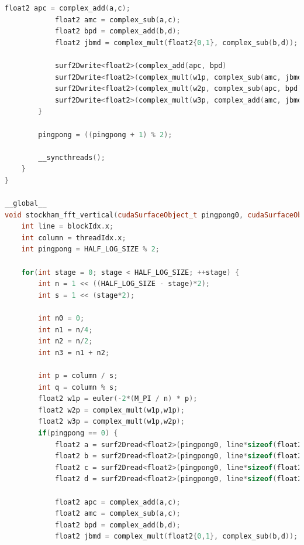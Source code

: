 \documentclass[
  oneside,
  11pt, a4paper,
  footinclude=true,
  headinclude=true,
  cleardoublepage=empty
]{scrbook}
\begin{document}
\begin{lstlisting}[language=C++,caption={FFT Radix-4 Stockham, see \autoref{sec:implementation-analysis-in-cuda}},label={lst:cuda-radix2-stockham}]
            float2 apc = complex_add(a,c);
            float2 amc = complex_sub(a,c);
            float2 bpd = complex_add(b,d);
            float2 jbmd = complex_mult(float2{0,1}, complex_sub(b,d));

            surf2Dwrite<float2>(complex_add(apc, bpd)                    , pingpong0, (q + s*(4*p + 0))*sizeof(float2), column);
            surf2Dwrite<float2>(complex_mult(w1p, complex_sub(amc, jbmd)), pingpong0, (q + s*(4*p + 1))*sizeof(float2), column);
            surf2Dwrite<float2>(complex_mult(w2p, complex_sub(apc, bpd)) , pingpong0, (q + s*(4*p + 2))*sizeof(float2), column);
            surf2Dwrite<float2>(complex_mult(w3p, complex_add(amc, jbmd)), pingpong0, (q + s*(4*p + 3))*sizeof(float2), column);
        }

        pingpong = ((pingpong + 1) % 2);

        __syncthreads();
    }
}

__global__
void stockham_fft_vertical(cudaSurfaceObject_t pingpong0, cudaSurfaceObject_t pingpong1, float fft_dir) {
    int line = blockIdx.x;
    int column = threadIdx.x;
    int pingpong = HALF_LOG_SIZE % 2;

    for(int stage = 0; stage < HALF_LOG_SIZE; ++stage) {
        int n = 1 << ((HALF_LOG_SIZE - stage)*2);
        int s = 1 << (stage*2);

        int n0 = 0;
        int n1 = n/4;
        int n2 = n/2;
        int n3 = n1 + n2;

        int p = column / s;
        int q = column % s;
        float2 w1p = euler(-2*(M_PI / n) * p);
        float2 w2p = complex_mult(w1p,w1p);
        float2 w3p = complex_mult(w1p,w2p);
        if(pingpong == 0) {
            float2 a = surf2Dread<float2>(pingpong0, line*sizeof(float2), q + s*(p + n0));
            float2 b = surf2Dread<float2>(pingpong0, line*sizeof(float2), q + s*(p + n1));
            float2 c = surf2Dread<float2>(pingpong0, line*sizeof(float2), q + s*(p + n2));
            float2 d = surf2Dread<float2>(pingpong0, line*sizeof(float2), q + s*(p + n3));

            float2 apc = complex_add(a,c);
            float2 amc = complex_sub(a,c);
            float2 bpd = complex_add(b,d);
            float2 jbmd = complex_mult(float2{0,1}, complex_sub(b,d));


\end{lstlisting}
\end{document}
